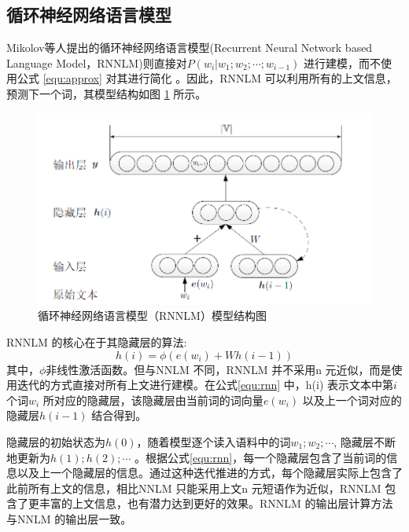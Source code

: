 \documentclass[12pt,a4paper]{article}
\begin{document}
\subsection{循环神经网络语言模型}
\label{sec:rnnlm}
Mikolov等人提出的循环神经网络语言模型(Recurrent Neural Network based Language Model，RNNLM)则直接对$P(w_i | w_1;w_2;\cdots;w_{i-1}) $ 进行建模，而不使用公式 \ref{equ:approx} 对其进行简化\cite{mikolov2012statistical,DBLP:conf/interspeech/MikolovKBCK10} 。因此，RNNLM 可以利用所有的上文信息，预测下一个词，其模型结构如图 \ref{fig:rnnlm} 所示。

\begin{figure}
  \centering
  \includegraphics[width=0.85\linewidth]{./figures/rnnlm.png}
  \caption{循环神经网络语言模型（RNNLM）模型结构图}\label{fig:rnnlm}
\end{figure}

RNNLM 的核心在于其隐藏层的算法:
\begin{equation}
\label{equ:rnn}
h(i) =\phi(e(w_i) +Wh(i -1))
\end{equation}
其中，$\phi$非线性激活函数。但与NNLM 不同，RNNLM 并不采用n 元近似，而是使用迭代的方式直接对所有上文进行建模。在公式\ref{equ:rnn} 中，h(i) 表示文本中第$i$ 个词$w_i$ 所对应的隐藏层，该隐藏层由当前词的词向量$e(w_i)$ 以及上一个词对应的隐藏层$h(i -1)$ 结合得到。

隐藏层的初始状态为$h(0)$，随着模型逐个读入语料中的词$w_1;w_2; \cdots $, 隐藏层不断地更新为$h(1);h(2); \cdots$ 。根据公式\ref{equ:rnn}，每一个隐藏层包含了当前词的信息以及上一个隐藏层的信息。通过这种迭代推进的方式，每个隐藏层实际上包含了此前所有上文的信息，相比NNLM 只能采用上文n 元短语作为近似，RNNLM 包含了更丰富的上文信息，也有潜力达到更好的效果。RNNLM 的输出层计算方法与NNLM 的输出层一致。
\end{document}
